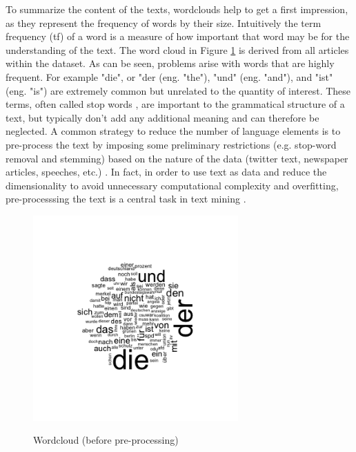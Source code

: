 \documentclass[12pt,a4paper,notitlepage]{article}
\begin{document}
\label{t_textlength}

To summarize the content of the texts, wordclouds help to get a first impression, as they represent the frequency of words by their size. Intuitively the term frequency (tf) of a word is a measure of how important that word may be for the understanding of the text. The word cloud in Figure \ref{fig_wordcloud1} is derived from all articles within the dataset. As can be seen, problems arise with words that are highly frequent. For example "die", or "der (eng. "the"), "und" (eng. "and"), and "ist" (eng. "is") are extremely common but unrelated to the quantity of interest. These terms, often called stop words \citep{gentzkow_text_2017}, are important to the grammatical structure of a text, but typically don't add any additional meaning and can therefore be neglected. A common strategy to reduce the number of language elements is to pre-process the text by imposing some preliminary restrictions (e.g. stop-word removal and stemming) based on the nature of the data (twitter text, newspaper articles, speeches, etc.) \citep{gentzkow_text_2017}. In fact, in order to use text as data and reduce the dimensionality to avoid unnecessary computational complexity and overfitting, pre-processsing the text is a central task in text mining \citep{bholat_text_2015}.  

\begin{figure}[H]
	\caption{Wordcloud (before pre-processing)}
	\begin{center}
		\includegraphics[width=0.7\textwidth]{figs/wordcloud.png}
		\label{fig_wordcloud1}
	\end{center}
\end{figure}
\end{document}
